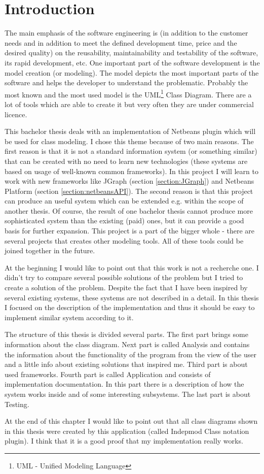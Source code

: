 \chapter{Introduction}

The main emphasis of the software engineering is (in addition to the customer needs and in addition to meet the defined development time, price and the desired quality) on the reusability, maintainability and testability of the software, its rapid development, etc. One important part of the software development is the model creation (or modeling). The model depicts the most important parts of the software and helps the developer to understand the problematic. Probably the most known and the most used model is the UML\footnote{UML - Unified Modeling Language} Class Diagram. There are a lot of tools which are able to create it but very often they are under commercial licence.

This bachelor thesis deals with an implementation of Netbeans plugin which will be used for class modeling. I chose this theme because of two main reasons. The first reason is that it is not a standard information system (or something similar) that can be created with no need to learn new technologies (these systems are based on usage of well-known common frameworks). In this project I will learn to work with new frameworks like JGraph (section \ref{section:JGraph}) and Netbeans Platform (section \ref{section:netbeansAPI}). The second reason is that this project can produce an useful system which can be extended e.g. within the scope of another thesis. Of course, the result of one bachelor thesis cannot produce more sophisticated system than the existing (paid) ones, but it can provide a good basis for further expansion. This project is a part of the bigger whole - there are several projects that creates other modeling tools. All of these tools could be joined together in the future.

At the beginning I would like to point out that this work is not a recherche one. I didn't try to compare several possible solutions of the problem but I tried to create a solution of the problem. Despite the fact that I have been inspired by several existing systems, these systems are not described in a detail. In this thesis I focused on the description of the implementation and thus it should be easy to implement similar system according to it.

The structure of this thesis is divided several parts. The first part brings some information about the class diagram. Next part is called Analysis and contains the information about the functionality of the program from the view of the user and a little info about existing solutions that inspired me. Third part is about used frameworks. Fourth part is called Application and consists of implementation documentation. In this part there is a description of how the system works inside and of some interesting subsystems. The last part is about Testing.

At the end of this chapter I would like to point out that all class diagrams shown in this thesis were created by this application (called Indepmod Class notation plugin). I think that it is a good proof that my implementation really works.
